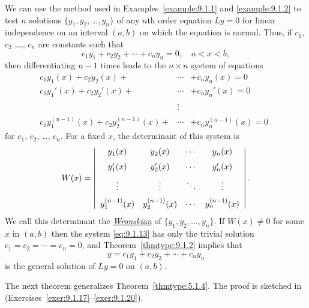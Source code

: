 \noindent
We can use the method used in Examples~\ref{example:9.1.1} and \ref{example:9.1.2} to test $n$
solutions $\{y_{1},y_{2},\dots,y_{n}\}$ of any $n$th order equation $Ly=0$ for linear independence
on an interval $(a,b)$ on which the equation is normal. Thus, if $c_{1}$, $c_{2}$ ,\dots, $c_{n}$
are constants such that
\[
  c_{1}y_{1}+c_{2}y_{2}+\cdots+c_{n}y_{n}=0,\quad a<x<b,
\]
then differentiating $n-1$ times leads to the $n\times n$ system of equations
\begin{equation}
  \label{eq:9.1.13}
  \begin{array}{rcl}
    c_{1}y_{1}(x)+c_{2}y_{2}(x)+                        & \cdots & +c_{n}y_{n}(x)=0                         \\
    c_{1}y_{1}'(x)+c_{2}y_{2}'(x)+                      & \cdots & +c_{n}y_{n}'(x)=0                        \\
    \phantom{c_{1}y_{1}^{(n)}(x)+c_{2}y_{2}^{(n-1)}(x)} & \vdots & \phantom{\cdots+c_{n}y_{n}^{(n-1)(x)}=q} \\
    c_{1}y_{1}^{(n-1)}(x)+c_{2}y_{2}^{(n-1)}(x)+        & \cdots & +c_{n}y_{n}^{(n-1)}(x) =0
  \end{array}
\end{equation}
for $c_{1}$, $c_{2}$, \dots, $c_{n}$. For a fixed $x$, the determinant of this system is
\[
  W(x)=\left|
  \begin{array}{cccc}
    y_{1}(x)         & y_{2}(x)         & \cdots & y_{n}(x)         \\[2\jot]
    y'_{1}(x)        & y'_{2}(x)        & \cdots & y_{n}'(x)        \\[2\jot]
    \vdots           & \vdots           & \ddots & \vdots           \\[2\jot]
    y_{1}^{(n-1)}(x) & y_{2}^{(n-1)}(x) & \cdots & y_{n}^{(n-1)}(x)
  \end{array}\right|.
\]
We call this determinant the
\href{https://mathshistory.st-andrews.ac.uk/Biographies/Wronski/}{\color{blue}
\it Wronskian\/}
of $\{y_{1},y_{2},\dots,y_{n}\}$. If $W(x)\ne0$ for some $x$ in $(a,b)$ then the system
\eqref{eq:9.1.13} has only the trivial solution $c_{1}=c_{2}=\cdots=c_{n}=0$, and
Theorem~\ref{thmtype:9.1.2} implies that
\[
  y=c_{1}y_{1}+c_{2}y_{2}+\cdots+c_{n}y_{n}
\]
is the general solution of $Ly=0$ on $(a,b)$.

The next theorem generalizes Theorem~\ref{thmtype:5.1.4}. The proof is sketched in
(Exercises~\ref{exer:9.1.17}--\ref{exer:9.1.20}).

